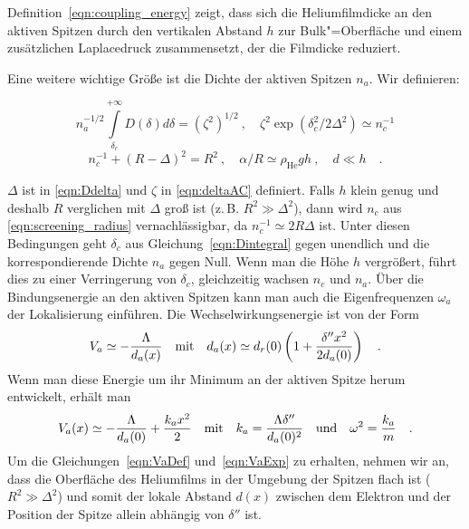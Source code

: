 Definition~\eqref{eqn:coupling_energy} zeigt, dass sich die Heliumfilmdicke an den aktiven Spitzen durch den vertikalen Abstand $h$ zur Bulk"=Oberfläche und einem zusätzlichen Laplacedruck zusammensetzt, der die Filmdicke reduziert.

Eine weitere wichtige Größe ist die Dichte der aktiven Spitzen $n_a$. Wir definieren:

	\begin{equation}
		\label{eqn:Dintegral}
		n_a^{-1/2}\int\limits_{\delta_c}^{+\infty}D(\delta) d\delta =
		(\zeta^2)^{1/2}~, \quad \zeta^2 \exp{(\delta_c^2/2\Delta^2)}\simeq
		n_c^{-1}
	\end{equation}
	\begin{equation}
		\label{eqn:screening_radius}
		n_c^{-1} +(R-\Delta)^2=R^2~, \quad
		\alpha/R \simeq \rho_\text{He} g h~, \quad  d\ll h\quad.
	\end{equation}

$\Delta$ ist in \eqref{eqn:Ddelta} und $\zeta$ in \eqref{eqn:deltaAC} definiert. Falls $h$ klein genug und deshalb $R$ verglichen mit $\Delta$ groß ist (z.\,B. $R^2\gg\Delta^2$), dann wird $n_c$ aus \eqref{eqn:screening_radius} vernachlässigbar, da $n_c^{-1}\simeq 2 R \Delta$ ist.
Unter diesen Bedingungen geht $\delta_c$ aus Gleichung~\eqref{eqn:Dintegral} gegen unendlich und die korrespondierende Dichte $n_a$ gegen Null. Wenn man die Höhe $h$ vergrößert, führt dies zu einer Verringerung von $\delta_c$, gleichzeitig wachsen $n_c$ und $n_a$.
Über die Bindungsenergie an den aktiven Spitzen kann man auch die Eigenfrequenzen $\omega_a$ der Lokalisierung einführen. Die Wechselwirkungsenergie ist von der Form
	\begin{equation}
		\label{eqn:VaDef}
		V_a\simeq-\frac{\Lambda}{d_a(x)}\quad\text{mit}\quad
			d_a(x)\simeq d_r(0)\left(1+\frac{\delta''x^2}{2d_a(0)}\right)\quad.
	\end{equation}
Wenn man diese Energie um ihr Minimum an der aktiven Spitze herum entwickelt, erhält man
	\begin{equation}
		\label{eqn:VaExp}
		V_a(x)\simeq-\frac{\Lambda}{d_a(0)}+\frac{k_ax^2}2\quad\text{mit}\quad
			k_a=\frac{\Lambda\delta''}{d_a(0)^2}\quad\text{und}\quad
		\omega^2=\frac{k_a}m\quad.
	\end{equation}
Um die Gleichungen~\eqref{eqn:VaDef} und~\eqref{eqn:VaExp} zu erhalten, nehmen wir an, dass die Oberfläche des Heliumfilms in der Umgebung der Spitzen flach ist ($R^2\gg\Delta^2$) und somit der lokale Abstand $d(x)$ zwischen dem Elektron und der Position der Spitze allein abhängig von $\delta''$ ist.

